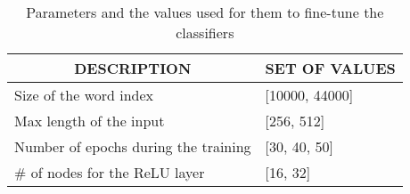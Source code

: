 



\begin{table}[tb]
\centering
\caption{Parameters and the values used for them to fine-tune the classifiers}
\begin{tabular}{ll}
\multicolumn{1}{c}{\textbf{DESCRIPTION} } & \multicolumn{1}{c}{\textbf{SET OF VALUES} }  \\ 
\toprule
Size of the word index                    & {[}10000, 44000]                             \\
Max length of the input                   & {[}256, 512]                                 \\
Number of epochs during the training      & {[}30, 40, 50]                               \\
\# of nodes for the ReLU layer            & {[}16, 32]                                   \\
\bottomrule
\end{tabular}
\end{table}

